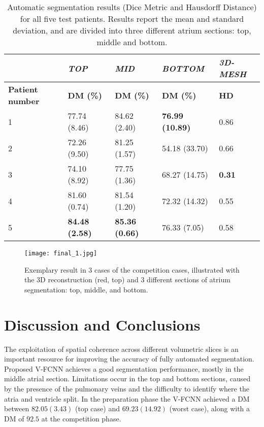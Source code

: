 \documentclass{llncs}
\begin{document}
\begin{table}[]
\centering
\begin{tabular}{|l|l|l|l|l|}
\hline
                        & \textit{\textbf{TOP}}  & \textit{\textbf{MID}} &  \textit{\textbf{BOTTOM}}   & \textit{\textbf{3D-MESH}} \\ \hline
\textbf{Patient number} & \textbf{DM (\%)}       & \textbf{DM (\%)}      & \textbf{DM (\%)}       & \textbf{HD}          \\ \hline
1                       &  77.74 (8.46)           & 84.62 (2.40)          &   \textbf{76.99 (10.89)}   & 0.86                      \\ \hline
2                       &  72.26 (9.50)           & 81.25 (1.57)          &   54.18 (33.70)            & 0.66                      \\ \hline
3                       &74.10 (8.92)             & 77.75 (1.36)          &   68.27 (14.75)           & \textbf{0.31}             \\ \hline
4                       & 81.60 (0.74)            & 81.54 (1.20)          &   72.32 (14.32)        & 0.55                      \\ \hline
5                       &\textbf{84.48 (2.58)}    & \textbf{85.36 (0.66)} &   76.33 (7.05)  & 0.58                      \\ \hline
\end{tabular}
\newline
\caption{Automatic segmentation results (Dice Metric and Hausdorff Distance) for all five test patients. Results report the mean and standard deviation, and are divided into three different atrium sections: top, middle and bottom.}
\end{table}

\begin{figure*}[ht]
\centering
 \texttt{[image: final\_1.jpg]}
   \caption{Exemplary result in 3 cases of the competition cases, illustrated with the 3D reconstruction (red, top) and 3 different sections of atrium segmentation: top, middle, and bottom.}
\label{fig:final_1}
\end{figure*}

\section{Discussion and Conclusions}

The exploitation of spatial coherence across different volumetric slices is an important resource for improving the accuracy of fully automated segmentation. Proposed V-FCNN achieves a good segmentation performance, mostly in the middle atrial section. Limitations occur in the top and bottom sections, caused by the presence of the pulmonary veins and the difficulty to identify where the atria and ventricle split. In the preparation phase the V-FCNN  achieved a DM between $82.05 (3.43)$ (top case) and $69.23 (14.92)$ (worst case), along with a DM of $92.5$ at the competition phase.
\end{document}
